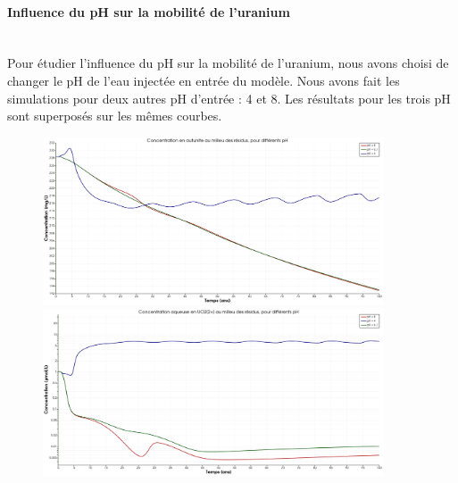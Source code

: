 \documentclass{article}
\begin{document}
\paragraph{Influence du pH sur la mobilité de l'uranium \\ \\}
Pour étudier l’influence du pH sur la mobilité de l’uranium, nous avons choisi de changer le pH de l’eau injectée en entrée du modèle. Nous avons fait les simulations pour deux autres pH d’entrée : 4 et 8. Les résultats pour les trois pH sont superposés sur les mêmes courbes.

\begin{figure}[H]
    \centering
    \begin{minipage}{0.5\textwidth}
        \centering
        \includegraphics[width=0.9\textwidth]{III_B_2_9.png} 
        \caption{}
        \label{fig:autunite_residus_comparaison}
    \end{minipage}\hfill
    \begin{minipage}{0.5\textwidth}
        \centering
        \includegraphics[width=0.9\textwidth]{III_B_2_10.png} 
        \caption{}
        \label{fig:UO2_residus_comparaison}
    \end{minipage}
\end{figure}
\end{document}
